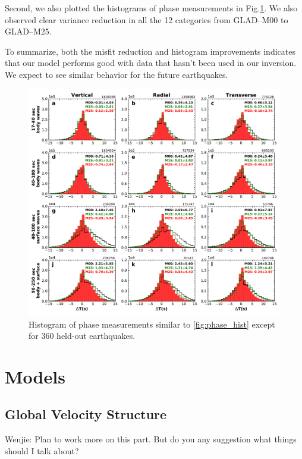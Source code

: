\documentclass[extra,mreferee]{gji}
\begin{document}
Second, we also plotted the histograms of phase measurements in Fig.\ref{fig:phase_hist_360}. We also observed clear variance reduction in all the 12 categories from GLAD--M00 to GLAD--M25.

To summarize, both the misfit reduction and histogram improvements indicates that our model performs good with data that hasn't been used in our inversion. We expect to see similar behavior for the future earthquakes.

\begin{figure}
  \centering
  \includegraphics[width=\textwidth]{figures/dt_histogram_360.pdf}
  \caption{Histogram of phase measurements similar to \ref{fig:phase_hist} except for 360 held-out earthquakes.}
  \label{fig:phase_hist_360}
\end{figure}



\section{Models}

\subsection{Global Velocity Structure}

{\color{Red} Wenjie: Plan to work more on this part. But do you any suggestion what things should I talk about?}
\end{document}
